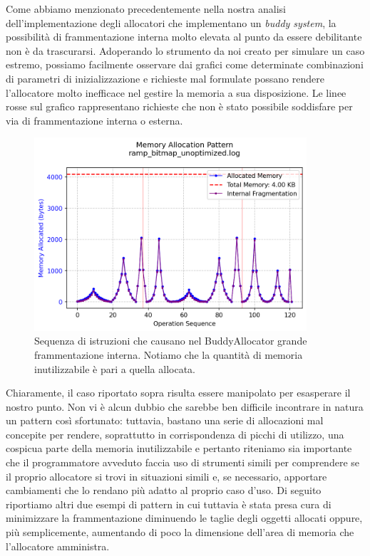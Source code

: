 Come abbiamo menzionato precedentemente nella nostra analisi dell'implementazione degli allocatori che implementano un \textit{buddy system}, la possibilità di frammentazione interna molto elevata al punto da essere debilitante non è da trascurarsi. Adoperando lo strumento da noi creato per simulare un caso estremo, possiamo facilmente osservare dai grafici come determinate combinazioni di parametri di inizializzazione e richieste mal formulate possano rendere l'allocatore molto inefficace nel gestire la memoria a sua disposizione. Le linee rosse sul grafico rappresentano richieste che non è stato possibile soddisfare per via di frammentazione interna o esterna.
\begin{figure}[H]
  \centering
  \includegraphics[width=0.9\textwidth]{graphs/ramp_bitmap_unoptimized.png}
  \caption{Sequenza di istruzioni che causano nel BuddyAllocator grande frammentazione interna. Notiamo che la quantità di memoria inutilizzabile è pari a quella allocata.}
  \label{fig:ramp_bitmap_unoptimized}
\end{figure}

Chiaramente, il caso riportato sopra risulta essere manipolato per esasperare il nostro punto. Non vi è alcun dubbio che sarebbe ben difficile incontrare in natura un pattern così sfortunato: tuttavia, bastano una serie di allocazioni mal concepite per rendere, soprattutto in corrispondenza di picchi di utilizzo, una cospicua parte della memoria inutilizzabile e pertanto riteniamo sia importante che il programmatore avveduto faccia uso di strumenti simili per comprendere se il proprio allocatore si trovi in situazioni simili e, se necessario, apportare cambiamenti che lo rendano più adatto al proprio caso d'uso. Di seguito riportiamo altri due esempi di pattern in cui tuttavia è stata presa cura di minimizzare la frammentazione diminuendo le taglie degli oggetti allocati oppure, più semplicemente, aumentando di poco la dimensione dell'area di memoria che l'allocatore amministra.


